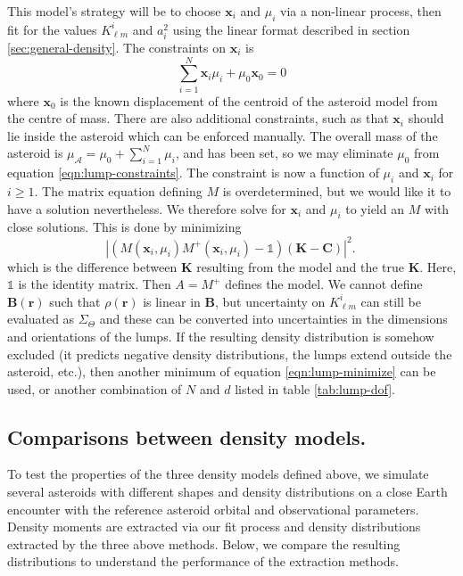 \documentclass[fleqn,usenatbib]{mnras}
\begin{document}
This model's strategy will be to choose $\bm x_i$ and $\mu_i$ via a non-linear process, then fit for the values $K_{\ell m}^i$ and $a_i^2$ using the linear format described in section \ref{sec:general-density}. The constraints on $\bm x_i$ is
\begin{equation}
  \sum_{i=1}^N \bm x_i \mu_i + \mu_0 \bm x_0 = 0
  \label{eqn:lump-constraints}
\end{equation}
where $\bm x_0$ is the known displacement of the centroid of the asteroid model from the centre of mass. There are also additional constraints, such as that $\bm x_i$ should lie inside the asteroid which can be enforced manually. The overall mass of the asteroid is $\mu_\mathcal{A} = \mu_0 + \sum_{i=1}^N \mu_i$, and has been set, so we may eliminate $\mu_0$ from equation \ref{eqn:lump-constraints}. The constraint is now a function of $\mu_i$ and $\bm x_i$ for $i \geq 1$. The matrix equation defining $M$ is overdetermined, but we would like it to have a solution nevertheless. We therefore solve for $\bm x_i$ and $\mu_i$ to yield an $M$ with close solutions. This is done by minimizing
\begin{equation}
  |(M(\bm x_i, \mu_i) M^+(\bm x_i, \mu_i) - \mathds{1}) (\bm K - \bm C)|^2.\
  \label{eqn:lump-minimize}
\end{equation}
which is the difference between $\bm K$ resulting from the model and the true $\bm K$. Here, $\mathds{1}$ is the identity matrix. Then $A=M^+$ defines the model. We cannot define $\bm B(\bm r)$ such that $\rho(\bm r)$ is linear in $\bm B$, but uncertainty on $K_{\ell m}^i$ can still be evaluated as $\Sigma_\Theta$ and these can be converted into uncertainties in the dimensions and orientations of the lumps. If the resulting density distribution is somehow excluded (it predicts negative density distributions, the lumps extend outside the asteroid, etc.), then another minimum of equation \ref{eqn:lump-minimize} can be used, or another combination of $N$ and $d$ listed in table \ref{tab:lump-dof}.




\subsection{Comparisons between density models.}
\label{sec:density-compare}

To test the properties of the three density models defined above, we simulate several asteroids with different shapes and density distributions on a close Earth encounter with the reference asteroid orbital and observational parameters. Density moments are extracted via our fit process and density distributions extracted by the three above methods. Below, we compare the resulting distributions to understand the performance of the extraction methods.
\end{document}
